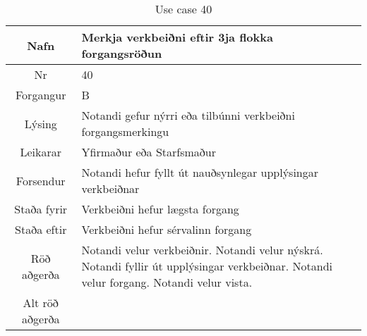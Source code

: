 \begin{table}[h!]\centering
\begin{tabular}{|c|p{10cm}|}
\hline
Nafn&Merkja verkbeiðni eftir 3ja flokka forgangsröðun\\
\hline
Nr&40\\
\hline
Forgangur&B\\
\hline
Lýsing&Notandi gefur nýrri eða tilbúnni verkbeiðni forgangsmerkingu\\
\hline
Leikarar&Yfirmaður eða Starfsmaður\\
\hline
Forsendur&Notandi hefur fyllt út nauðsynlegar upplýsingar verkbeiðnar\\
\hline
Staða fyrir&Verkbeiðni hefur lægsta forgang\\
\hline
Staða eftir&Verkbeiðni hefur sérvalinn forgang\\
\hline
Röð aðgerða&Notandi velur verkbeiðnir. Notandi velur nýskrá. Notandi fyllir út upplýsingar verkbeiðnar. Notandi velur forgang. Notandi velur vista.\\
\hline
Alt röð aðgerða&\\
\hline
\end{tabular}
\caption{Use case 40}\label{tab:use_case_40}
\end{table}
